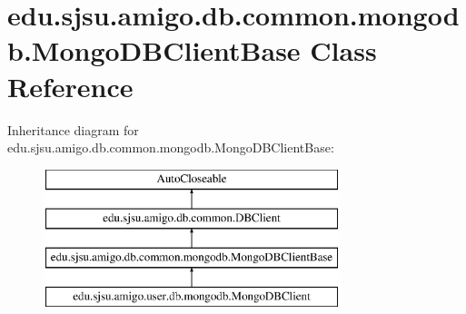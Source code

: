 \hypertarget{classedu_1_1sjsu_1_1amigo_1_1db_1_1common_1_1mongodb_1_1_mongo_d_b_client_base}{}\section{edu.\+sjsu.\+amigo.\+db.\+common.\+mongodb.\+Mongo\+D\+B\+Client\+Base Class Reference}
\label{classedu_1_1sjsu_1_1amigo_1_1db_1_1common_1_1mongodb_1_1_mongo_d_b_client_base}
Inheritance diagram for edu.\+sjsu.\+amigo.\+db.\+common.\+mongodb.\+Mongo\+D\+B\+Client\+Base\+:\begin{figure}[H]
\begin{center}
\leavevmode
\includegraphics[height=4.000000cm]{classedu_1_1sjsu_1_1amigo_1_1db_1_1common_1_1mongodb_1_1_mongo_d_b_client_base}
\end{center}
\end{figure}

